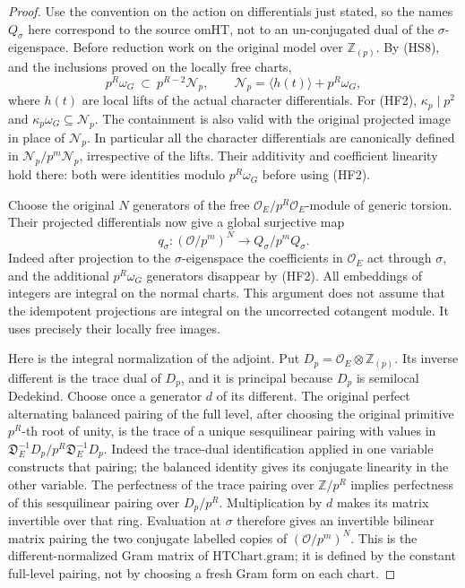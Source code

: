 \begin{proof}
Use the convention on the action on differentials just stated, so
the names \(Q_\sigma\) here correspond to the source
\(\mathrm{omHT}\), not to an un-conjugated dual of the
\(\sigma\)-eigenspace. Before reduction work on the original model
over \(\mathbb Z_{(p)}\). By (HS8), and the inclusions proved on
the locally free charts,
\[
 p^R\omega_G\ \subset\ p^{R-2}\mathcal N_p,\qquad
 \mathcal N_p=\langle h(t)\rangle+p^R\omega_G ,
 \tag{HF2}
\]
where \(h(t)\) are local lifts of the actual character differentials.
For (HF2), \(\kappa_p\mid p^2\) and
\(\kappa_p\omega_G\subseteq\mathcal N_p\).
The containment is also valid with the original projected image in
place of \(\mathcal N_p\). In particular all the character
differentials are canonically defined in
\(\mathcal N_p/p^m\mathcal N_p\), irrespective of the lifts.
Their additivity and coefficient linearity hold there: both were
identities modulo \(p^R\omega_G\) before using (HF2).

Choose the original \(N\) generators of the free
\(\mathcal O_E/p^R\mathcal O_E\)-module of generic torsion.
Their projected differentials now give a global surjective map
\[
 q_\sigma:(\mathcal O/p^m)^N\longrightarrow Q_\sigma/p^m Q_\sigma .
 \tag{HF3}
\]
Indeed after projection to the \(\sigma\)-eigenspace the coefficients
in \(\mathcal O_E\) act through \(\sigma\), and the additional
\(p^R\omega_G\) generators disappear by (HF2).
All embeddings of integers are integral on the normal charts.
This argument does not assume that the idempotent projections are
integral on the uncorrected cotangent module. It uses precisely
their locally free images.

Here is the integral normalization of the adjoint. Put
\(D_p=\mathcal O_E\otimes\mathbb Z_{(p)}\).
Its inverse different is the trace dual of \(D_p\), and it is
principal because \(D_p\) is semilocal Dedekind. Choose once a
generator \(d\) of its different. The original perfect alternating
balanced pairing of the full level, after choosing the original
primitive \(p^R\)-th root of unity, is the trace of a unique
sesquilinear pairing with values in
\(\mathfrak D_E^{-1}D_p/p^R\mathfrak D_E^{-1}D_p\).
Indeed the trace-dual identification applied in one variable
constructs that pairing; the balanced identity gives its conjugate
linearity in the other variable. The perfectness of the trace
pairing over \(\mathbb Z/p^R\) implies perfectness of this
sesquilinear pairing over \(D_p/p^R\).
Multiplication by \(d\) makes its matrix invertible over that
ring. Evaluation at \(\sigma\) therefore gives an invertible
bilinear matrix pairing the two conjugate labelled copies of
\((\mathcal O/p^m)^N\).
This is the different-normalized Gram matrix of
\(\mathrm{HTChart.gram}\); it is defined by the constant full-level
pairing, not by choosing a fresh Gram form on each chart.


\end{proof}
